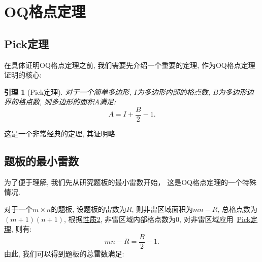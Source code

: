 \documentclass{ctexart}
\newcommand{\varible}[1]{{\Noto[#1]}}
\newtheorem{lemma}{引理}
\begin{document}
\section{OQ格点定理}
\subsection{Pick定理}
在具体证明OQ格点定理之前, 我们需要先介绍一个重要的定理, 作为OQ格点定理证明的核心:
\begin{lemma}[Pick定理]
    \label{pick}
    对于一个简单多边形, $I$为多边形内部的格点数, $B$为多边形边界的格点数, 则多边形的面积$A$满足:
    \begin{equation}
        A = I + \frac{B}{2} - 1.
    \end{equation}
\end{lemma}
这是一个非常经典的定理, 其证明略.

\subsection{\varible{O}\varible{Q}题板的最小雷数}
为了便于理解, 我们先从研究\varible{O}\varible{Q}题板的最小雷数开始， 这是OQ格点定理的一个特殊情况.

对于一个$m\times n$的题板, 设题板的雷数为$R$, 则非雷区域面积为$mn-R$, 总格点数为$(m+1)(n+1)$, 根据\hyperref[p2]{性质2}, 非雷区域内部格点数为0, 对非雷区域应用\ \hyperref[pick]{Pick定理}, 则有:
\begin{equation}
    \label{basic equation}
    mn - R = \frac{B}{2} - 1.
\end{equation}
由此, 我们可以得到\varible{O}\varible{Q}题板的总雷数满足:
\end{document}
